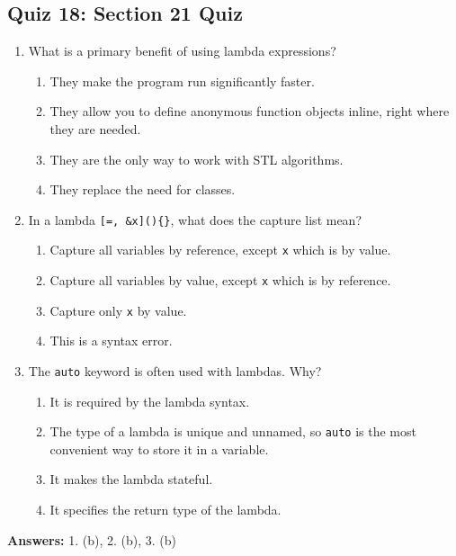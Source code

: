 \subsection{Quiz 18: Section 21 Quiz}
\begin{enumerate}
    \item What is a primary benefit of using lambda expressions?
    \begin{enumerate}
        \item[a)] They make the program run significantly faster.
        \item[b)] They allow you to define anonymous function objects inline, right where they are needed.
        \item[c)] They are the only way to work with STL algorithms.
        \item[d)] They replace the need for classes.
    \end{enumerate}

    \item In a lambda \texttt{[=, \&x]()\{\}}, what does the capture list mean?
    \begin{enumerate}
        \item[a)] Capture all variables by reference, except \texttt{x} which is by value.
        \item[b)] Capture all variables by value, except \texttt{x} which is by reference.
        \item[c)] Capture only \texttt{x} by value.
        \item[d)] This is a syntax error.
    \end{enumerate}

    \item The \texttt{auto} keyword is often used with lambdas. Why?
    \begin{enumerate}
        \item[a)] It is required by the lambda syntax.
        \item[b)] The type of a lambda is unique and unnamed, so \texttt{auto} is the most convenient way to store it in a variable.
        \item[c)] It makes the lambda stateful.
        \item[d)] It specifies the return type of the lambda.
    \end{enumerate}
\end{enumerate}

\textbf{Answers:} 1. (b), 2. (b), 3. (b)
